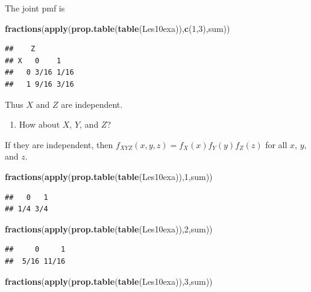 \documentclass[]{book}
\newenvironment{Shaded}{\begin{snugshade}}{\end{snugshade}}
\newcommand{\KeywordTok}[1]{\textcolor[rgb]{0.13,0.29,0.53}{\textbf{#1}}}
\newcommand{\DecValTok}[1]{\textcolor[rgb]{0.00,0.00,0.81}{#1}}
\newcommand{\NormalTok}[1]{#1}
\providecommand{\tightlist}{%
  \setlength{\itemsep}{0pt}\setlength{\parskip}{0pt}}
\theoremstyle{definition}
\theoremstyle{definition}
\theoremstyle{definition}
\theoremstyle{remark}
\begin{document}
The joint pmf is

\begin{Shaded}
\begin{Highlighting}[]
\KeywordTok{fractions}\NormalTok{(}\KeywordTok{apply}\NormalTok{(}\KeywordTok{prop.table}\NormalTok{(}\KeywordTok{table}\NormalTok{(Les10exa)),}\KeywordTok{c}\NormalTok{(}\DecValTok{1}\NormalTok{,}\DecValTok{3}\NormalTok{),sum))}
\end{Highlighting}
\end{Shaded}

\begin{verbatim}
##    Z
## X   0    1   
##   0 3/16 1/16
##   1 9/16 3/16
\end{verbatim}

Thus \(X\) and \(Z\) are independent.

\begin{enumerate}
\def\labelenumi{\arabic{enumi}.}
\setcounter{enumi}{5}
\tightlist
\item
  How about \(X\), \(Y\), and \(Z\)?
\end{enumerate}

If they are independent, then
\(f_{XYZ}(x,y,z)=f_{X}(x)f_{Y}(y)f_{Z}(z)\) for all \(x\), \(y\), and
\(z\).

\begin{Shaded}
\begin{Highlighting}[]
\KeywordTok{fractions}\NormalTok{(}\KeywordTok{apply}\NormalTok{(}\KeywordTok{prop.table}\NormalTok{(}\KeywordTok{table}\NormalTok{(Les10exa)),}\DecValTok{1}\NormalTok{,sum))}
\end{Highlighting}
\end{Shaded}

\begin{verbatim}
##   0   1 
## 1/4 3/4
\end{verbatim}

\begin{Shaded}
\begin{Highlighting}[]
\KeywordTok{fractions}\NormalTok{(}\KeywordTok{apply}\NormalTok{(}\KeywordTok{prop.table}\NormalTok{(}\KeywordTok{table}\NormalTok{(Les10exa)),}\DecValTok{2}\NormalTok{,sum))}
\end{Highlighting}
\end{Shaded}

\begin{verbatim}
##     0     1 
##  5/16 11/16
\end{verbatim}

\begin{Shaded}
\begin{Highlighting}[]
\KeywordTok{fractions}\NormalTok{(}\KeywordTok{apply}\NormalTok{(}\KeywordTok{prop.table}\NormalTok{(}\KeywordTok{table}\NormalTok{(Les10exa)),}\DecValTok{3}\NormalTok{,sum))}
\end{Highlighting}
\end{Shaded}
\end{document}
